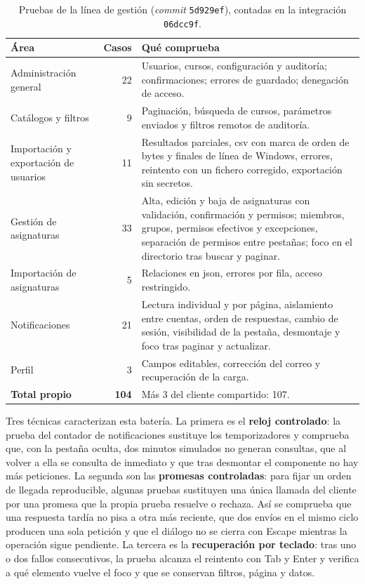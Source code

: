 \begin{table}[htbp]
  \centering
  \small
  \begin{tabular}{p{}rp{}}
    \toprule
    \textbf{Área} & \textbf{Casos} & \textbf{Qué comprueba} \\
    \midrule
    Administración general & 22 & Usuarios, cursos, configuración y auditoría;
      confirmaciones; errores de guardado; denegación de acceso. \\
    Catálogos y filtros & 9 & Paginación, búsqueda de cursos, parámetros enviados y
      filtros remotos de auditoría. \\
    Importación y exportación de usuarios & 11 & Resultados parciales, \acs{csv} con
      marca de orden de bytes y finales de línea de Windows, errores, reintento con un
      fichero corregido, exportación sin secretos. \\
    Gestión de asignaturas & 33 & Alta, edición y baja de asignaturas con validación,
      confirmación y permisos; miembros, grupos, permisos efectivos y excepciones,
      separación de permisos entre pestañas; foco en el directorio tras buscar y
      paginar. \\
    Importación de asignaturas & 5 & Relaciones en \acs{json}, errores por fila, acceso
      restringido. \\
    Notificaciones & 21 & Lectura individual y por página, aislamiento entre cuentas,
      orden de respuestas, cambio de sesión, visibilidad de la pestaña, desmontaje y foco
      tras paginar y actualizar. \\
    Perfil & 3 & Campos editables, corrección del correo y recuperación de la carga. \\
    \midrule
    \textbf{Total propio} & \textbf{104} & Más 3 del cliente compartido: 107. \\
    \bottomrule
  \end{tabular}
  \caption{Pruebas de la línea de gestión (\textit{commit} \texttt{5d929ef}), contadas en
    la integración \texttt{06dcc9f}.\label{TAB:TEST-ADMIN}}
\end{table}

Tres técnicas caracterizan esta batería. La primera es el \textbf{reloj controlado}: la
prueba del contador de notificaciones sustituye los temporizadores y comprueba que, con la
pestaña oculta, dos minutos simulados no generan consultas, que al volver a ella se consulta
de inmediato y que tras desmontar el componente no hay más peticiones. La segunda son las
\textbf{promesas controladas}: para fijar un orden de llegada reproducible, algunas pruebas
sustituyen una única llamada del cliente por una promesa que la propia prueba resuelve o
rechaza. Así se comprueba que una respuesta tardía no pisa a otra más reciente, que dos
envíos en el mismo ciclo producen una sola petición y que el diálogo no se cierra con
Escape mientras la operación sigue pendiente. La tercera es la \textbf{recuperación por
teclado}: tras uno o dos fallos consecutivos, la prueba alcanza el reintento con Tab y Enter
y verifica a qué elemento vuelve el foco y que se conservan filtros, página y datos.

